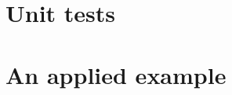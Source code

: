 \documentclass{beamer}
\begin{document}


\section{Unit tests}

\iffalse

\else

\fi

\section{An applied example}


\end{document}

